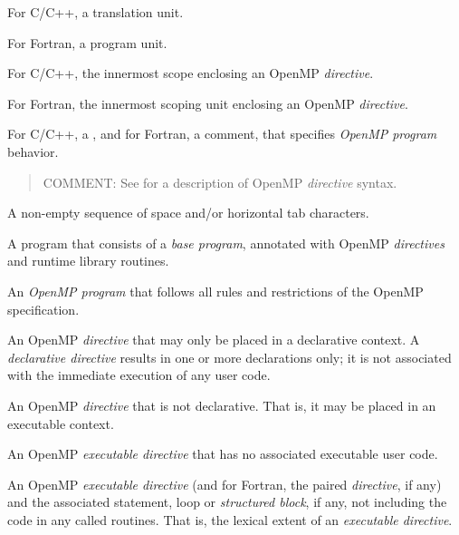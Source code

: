 \glossarydefstart
For C/C++, a translation unit.

For Fortran, a program unit.
\glossarydefend

\glossarydefstart
For C/C++, the innermost scope enclosing an OpenMP \emph{directive}.

For Fortran, the innermost scoping unit enclosing an OpenMP \emph{directive}.
\glossarydefend

\glossarydefstart
For C/C++, a , and for Fortran, a comment, that specifies \emph{OpenMP
program} behavior.

\begin{quote}
COMMENT: See  for a description of OpenMP \emph{directive} syntax.
\end{quote}
\glossarydefend


\glossarydefstart
A non-empty sequence of space and/or horizontal tab characters.
\glossarydefend

\glossarydefstart
A program that consists of a \emph{base program}, annotated with OpenMP \emph{directives} and
runtime library routines.
\glossarydefend

\glossarydefstart
An \emph{OpenMP program} that follows all rules and restrictions of the OpenMP
specification.
\glossarydefend

\glossarydefstart
An OpenMP \emph{directive} that may only be placed in a declarative context. A
\emph{declarative directive} results in one or more declarations only; it is not associated
with the immediate execution of any user code.
\glossarydefend

\glossarydefstart
An OpenMP \emph{directive} that is not declarative. That is, it may be placed in an
executable context.
\glossarydefend

\glossarydefstart
An OpenMP \emph{executable directive} that has no associated executable user code.
\glossarydefend


\glossarydefstart
An OpenMP \emph{executable directive} (and for Fortran, the paired  \emph{directive}, if
any) and the associated statement, loop or \emph{structured block}, if any, not including
the code in any called routines. That is, the lexical extent of an \emph{executable
directive}.
\glossarydefend


